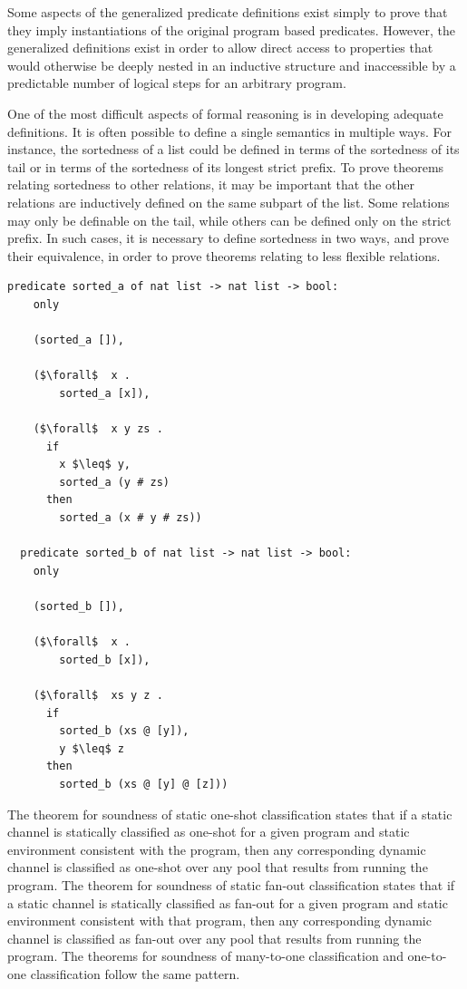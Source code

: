 \documentclass{article}
\begin{document}
Some aspects of the generalized predicate definitions exist simply to prove that they imply
instantiations of the original program based predicates. However, the generalized
definitions exist in order to allow direct access to properties that would
otherwise be deeply nested
in an inductive structure and inaccessible by a predictable number of
logical steps for an arbitrary
program.

One of the most difficult aspects of formal reasoning is in developing adequate definitions.
It is often possible to define a single semantics in multiple ways.
For instance, the sortedness of a list could be defined in terms of the sortedness of its tail
or in terms of the sortedness of its longest strict prefix. To prove theorems relating
sortedness to other relations, it may be important that the other relations are inductively
defined on the same subpart of the list. Some relations may only be definable on the tail,
while others can be defined only on the strict prefix. In such cases, it is necessary to
define sortedness in two ways, and prove their equivalence, in order to prove theorems relating
to less flexible relations.

\begin{lstlisting}[language=logic, mathescape]
  predicate sorted_a of nat list -> nat list -> bool:
    only

    (sorted_a []),

    ($\forall$  x .
        sorted_a [x]),

    ($\forall$  x y zs .
      if 
        x $\leq$ y,
        sorted_a (y # zs)
      then
        sorted_a (x # y # zs))

  predicate sorted_b of nat list -> nat list -> bool:
    only

    (sorted_b []),

    ($\forall$  x .
        sorted_b [x]),

    ($\forall$  xs y z .
      if 
        sorted_b (xs @ [y]),
        y $\leq$ z 
      then
        sorted_b (xs @ [y] @ [z]))
  \end{lstlisting}

The theorem for soundness of static one-shot classification states that if a static channel is
statically classified as one-shot for a given program and
static environment consistent with the
program, then any corresponding dynamic channel is classified
as one-shot over any pool that results
from running the program. The theorem for soundness of
static fan-out classification states that if
a static channel is statically classified as fan-out for a given program and static environment
consistent with that program, then any corresponding dynamic channel is classified as fan-out
over any pool that results from running the program.  The theorems for soundness of many-to-one
classification and one-to-one classification follow the same pattern. 
\end{document}
